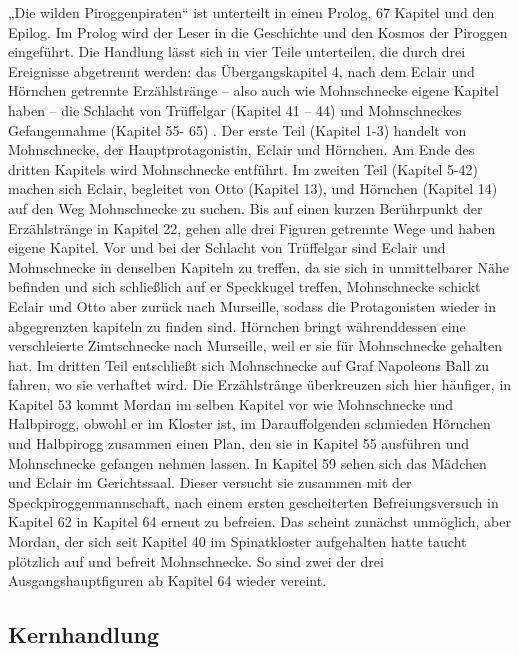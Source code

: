 „Die wilden Piroggenpiraten“ ist unterteilt in einen Prolog, 67 Kapitel und den Epilog. Im Prolog wird der Leser in die Geschichte und den Kosmos der Piroggen eingeführt. Die Handlung lässt sich in vier Teile unterteilen, die durch drei Ereignisse abgetrennt werden: das Übergangskapitel 4, nach dem Eclair und Hörnchen getrennte Erzählstränge – also auch wie Mohnschnecke eigene Kapitel haben – die Schlacht von Trüffelgar (Kapitel 41 – 44) und Mohnschneckes Gefangennahme (Kapitel 55- 65) . Der erste Teil (Kapitel 1-3) handelt von Mohnschnecke, der Hauptprotagonistin, Eclair und Hörnchen. Am Ende des dritten Kapitels wird Mohnschnecke entführt. Im zweiten Teil (Kapitel 5-42) machen sich Eclair, begleitet von Otto (Kapitel 13), und Hörnchen (Kapitel 14) auf den Weg Mohnschnecke zu suchen. Bis auf einen kurzen Berührpunkt der Erzählstränge in Kapitel 22, gehen alle drei Figuren getrennte Wege und haben eigene Kapitel. Vor und bei der Schlacht von Trüffelgar sind Eclair und Mohnschnecke in denselben Kapiteln zu treffen, da sie sich in unmittelbarer Nähe befinden und sich schließlich auf er Speckkugel treffen,  Mohnschnecke schickt Eclair und Otto aber zurück nach Murseille, sodass die Protagonisten wieder in abgegrenzten kapiteln zu finden sind. Hörnchen bringt währenddessen eine verschleierte Zimtschnecke nach Murseille, weil er sie für Mohnschnecke gehalten hat. Im dritten Teil entschließt sich Mohnschnecke auf Graf Napoleons Ball zu fahren, wo sie verhaftet wird. Die Erzählstränge überkreuzen sich hier häufiger, in Kapitel 53 kommt Mordan im selben Kapitel vor wie Mohnschnecke und Halbpirogg, obwohl er im Kloster ist, im Darauffolgenden schmieden Hörnchen und Halbpirogg zusammen einen Plan, den sie in Kapitel 55 ausführen und Mohnschnecke gefangen nehmen lassen. In Kapitel 59 sehen sich das Mädchen und Eclair im Gerichtssaal. Dieser versucht sie zusammen mit der Speckpiroggenmannschaft, nach einem ersten gescheiterten Befreiungsversuch in Kapitel 62 in Kapitel 64 erneut zu befreien. Das scheint zunächst unmöglich, aber Mordan, der sich seit Kapitel 40 im Spinatkloster aufgehalten hatte taucht plötzlich auf und befreit Mohnschnecke. So sind zwei der drei Ausgangshauptfiguren ab Kapitel 64 wieder vereint.

\subsection{Kernhandlung}


